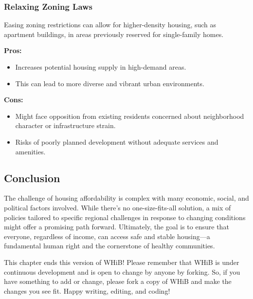 \subsubsection*{Relaxing Zoning Laws}
Easing zoning restrictions can allow for higher-density housing, such as apartment buildings, in areas previously reserved for single-family homes.

\textbf{Pros:}
\begin{itemize}
    \item Increases potential housing supply in high-demand areas.
    \item This can lead to more diverse and vibrant urban environments.
\end{itemize}

\textbf{Cons:}
\begin{itemize}
    \item Might face opposition from existing residents concerned about neighborhood character or infrastructure strain.
    \item Risks of poorly planned development without adequate services and amenities.
\end{itemize}

\subsection*{Conclusion}
The challenge of housing affordability is complex with many economic, social, and political factors involved. While there's no one-size-fits-all solution, a mix of policies tailored to specific regional challenges in response to changing conditions might offer a promising path forward. Ultimately, the goal is to ensure that everyone, regardless of income, can access safe and stable housing—a fundamental human right and the cornerstone of healthy communities.

This chapter ends this version of WHiB! Please remember that WHiB is under continuous development and is open to change by anyone by forking. So, if you have something to add or change, please fork a copy of WHiB and make the changes you see fit. Happy writing, editing, and coding!
